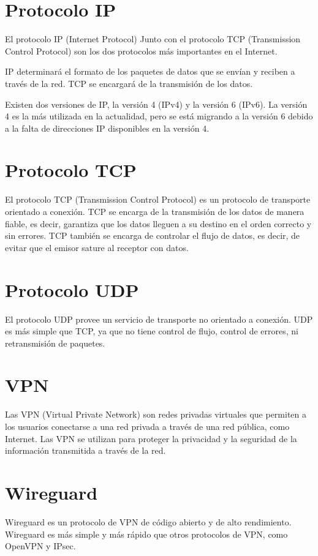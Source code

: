 \section{Protocolo IP} %

El protocolo IP (Internet Protocol) Junto con el protocolo TCP (Transmission Control Protocol) son los dos protocolos más importantes en el Internet.

IP determinará el formato de los paquetes de datos que se envían y reciben a través de la red. TCP se encargará de la transmisión de los datos.

Existen dos versiones de IP, la versión 4 (IPv4) y la versión 6 (IPv6). La versión 4 es la más utilizada en la actualidad, pero se está migrando a la versión 6 debido a la falta de direcciones IP disponibles en la versión 4.

\section{Protocolo TCP} %
El protocolo TCP (Transmission Control Protocol) es un protocolo de transporte orientado a conexión. TCP se encarga de la transmisión de los datos de manera fiable, es decir, garantiza que los datos lleguen a su destino en el orden correcto y sin errores. TCP también se encarga de controlar el flujo de datos, es decir, de evitar que el emisor sature al receptor con datos.

\section{Protocolo UDP} %

El protocolo UDP provee un servicio de transporte no orientado a conexión. UDP es más simple que TCP, ya que no tiene control de flujo, control de errores, ni retransmisión de paquetes.

\section{VPN} %
Las VPN (Virtual Private Network) son redes privadas virtuales que permiten a los usuarios conectarse a una red privada a través de una red pública, como Internet. Las VPN se utilizan para proteger la privacidad y la seguridad de la información transmitida a través de la red.

\section{Wireguard} %
Wireguard es un protocolo de VPN de código abierto y de alto rendimiento. Wireguard es más simple y más rápido que otros protocolos de VPN, como OpenVPN y IPsec.


